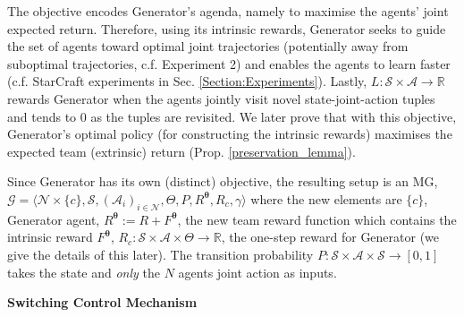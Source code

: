 \documentclass{article}
\begin{document}
The objective encodes {\selectfont Generator}'s agenda, namely to maximise the agents' joint expected return. Therefore, using its intrinsic rewards,  {\selectfont Generator} seeks to guide the set of agents toward optimal joint trajectories (potentially away from suboptimal trajectories, c.f. Experiment 2) and enables the agents to learn faster (c.f. StarCraft experiments in Sec. \ref{Section:Experiments}). Lastly, $L:\mathcal{S}\times\boldsymbol{\mathcal{A}}\to\mathbb{R}$ rewards {\selectfont Generator} when the agents jointly visit novel state-joint-action tuples and tends to $0$ as the tuples are revisited. We later prove that with this objective, {\selectfont Generator}'s optimal policy (for constructing the intrinsic rewards) maximises the expected team (extrinsic) return (Prop. \ref{preservation_lemma}).    

Since {\selectfont Generator} has its own (distinct) objective, the resulting setup is an MG, $\mathcal{G}=\langle \mathcal{N}\times\{c\},\mathcal{S},(\mathcal{A}_i)_{i\in\mathcal{N}},\Theta,P,R^{\boldsymbol{\theta}},R_c,\gamma\rangle$ where the new elements are $\{c\}$,  {\selectfont Generator} agent, $R^{\boldsymbol{\theta}}:=R+F^{\boldsymbol{\theta}}$, the new team reward function which contains the intrinsic reward $F^{\boldsymbol{\theta}}$,  $R_c:\mathcal{S}\times\boldsymbol{\mathcal{A}}\times\Theta\to\mathbb{R}$, the one-step reward for {\selectfont Generator} (we give the details of this later). The transition probability $P:\mathcal{S}\times\boldsymbol{\mathcal{A}}\times\mathcal{S}\to[0,1]$ takes the state and \textit{only} the $N$ agents joint action as inputs.


\textbf{Switching Control Mechanism}
\end{document}

